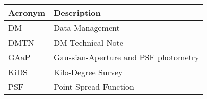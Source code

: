 \addtocounter{table}{-1}
\begin{longtable}{p{}p{}}\hline
\textbf{Acronym} & \textbf{Description}  \\\hline

DM & Data Management \\\hline
DMTN & DM Technical Note \\\hline
GAaP & Gaussian-Aperture and PSF photometry \\\hline
KiDS & Kilo-Degree Survey \\\hline
PSF & Point Spread Function \\\hline
\end{longtable}
